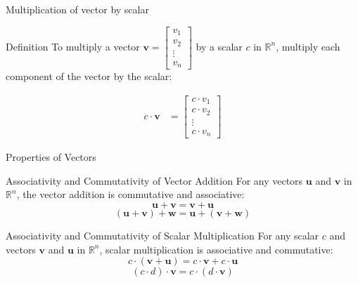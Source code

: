 \documentclass{beamer}
\begin{document}
\begin{frame}{Multiplication of vector by scalar}

  \begin{block}{Definition}
    To multiply a vector \( \mathbf{v} = \begin{bmatrix} v_1 \\ v_2 \\ \vdots \\ v_n \end{bmatrix} \) by a scalar \( c \) in \( \mathbb{R}^n \), multiply each component of the vector by the scalar:

  \begin{align*}
    c \cdot \mathbf{v} &= \begin{bmatrix} c \cdot v_1 \\ c \cdot v_2 \\ \vdots \\ c \cdot v_n \end{bmatrix}
  \end{align*}
\end{block}
\end{frame}

\begin{frame}{Properties of Vectors}
  \begin{block}{Associativity and Commutativity of Vector Addition}
    For any vectors \( \mathbf{u} \) and \( \mathbf{v} \) in \( \mathbb{R}^n \), the vector addition is commutative and associative:
    $$    \mathbf{u} + \mathbf{v} = \mathbf{v} + \mathbf{u}$$
    $$    (\mathbf{u} + \mathbf{v}) + \mathbf{w} = \mathbf{u} + (\mathbf{v} + \mathbf{w})$$
  \end{block}

\pause  \begin{block}{Associativity and Commutativity of Scalar Multiplication}
    For any scalar \( c \) and vectors \( \mathbf{v} \) and \( \mathbf{u} \) in \( \mathbb{R}^n \), scalar multiplication is associative and commutative:
$$    c \cdot (\mathbf{v} + \mathbf{u}) = c \cdot \mathbf{v} + c \cdot \mathbf{u}$$
$$    (c \cdot d) \cdot \mathbf{v} = c \cdot (d \cdot \mathbf{v})$$
  \end{block}
\end{frame}
\end{document}
